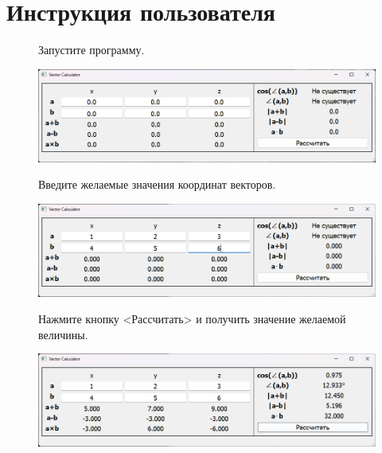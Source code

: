 \label{sec:instruction}
\section{Инструкция пользователя}

\begin{enumerate}
    
    \begin{figure}[H]
        \item Запустите программу.
        \vspace{0.3cm}
        

        \includegraphics[width=\textwidth]{img//instruction1}
        \caption{}
    \end{figure}

    
    \begin{figure}[H]
        \item Введите желаемые значения координат векторов.
        \vspace{0.3cm}


        \includegraphics[width=\textwidth]{img//instruction2}
        \caption{}
    \end{figure}


    \begin{figure}[H]
        \item Нажмите кнопку <Рассчитать> и получить значение желаемой величины.
        \vspace{0.3cm}


        \includegraphics[width=\textwidth]{img//instruction3}
        \caption{}
    \end{figure}

\end{enumerate}